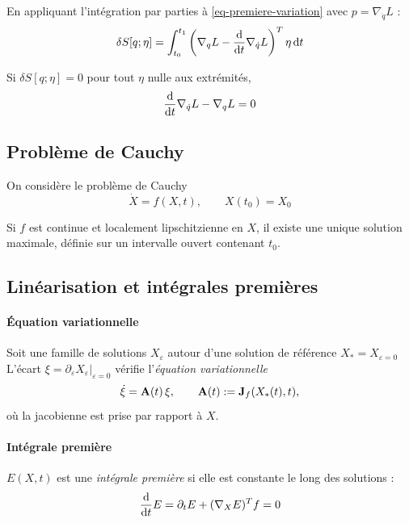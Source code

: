 En appliquant l'intégration par parties à
\eqref{eq-premiere-variation} avec $p = \nabla_{\dot q}L$ :
\[
    \delta S[q;\eta] = \int_{t_0}^{t_1}
    \left(\nabla_q L - \frac{\mathrm{d}}{\mathrm{d} t}\nabla_{\dot q} L\right)^T\eta\,\mathrm{d} t
\]

\begin{corollaire}
    Si $\delta S[q;\eta] = 0$ pour tout $\eta$ nulle aux extrémités,
    \[
        \frac{\mathrm{d}}{\mathrm{d} t}\nabla_{\dot q} L - \nabla_q L = 0
    \]
\end{corollaire}

\subsection{Problème de Cauchy}

On considère le problème de Cauchy
\[
    \dot X = f(X,t),
    \qquad X(t_0) = X_0
\]

\begin{theoreme}
    Si $f$ est continue et localement lipschitzienne en $X$, il existe
    une unique solution maximale, définie sur un intervalle ouvert
    contenant $t_0$.
\end{theoreme}

\subsection{Linéarisation et intégrales premières}

\paragraph{Équation variationnelle}

Soit une famille de solutions $X_\varepsilon$ autour d'une solution
de référence $X_* = X_{\varepsilon=0}$ L'écart
$\xi = \partial_\varepsilon X_\varepsilon|_{\varepsilon=0}$ vérifie
l'\emph{équation variationnelle}
\[
    \dot\xi = \mathbf{A}(t)\,\xi,
    \qquad \mathbf{A}(t) := \mathbf{J}_f(X_*(t),t),
\]
où la jacobienne est prise par rapport à $X$.

\paragraph{Intégrale première}

\begin{definition}
    $E(X,t)$ est une \emph{intégrale première} si elle est constante
    le long des solutions :
    \[
        \frac{\mathrm{d}}{\mathrm{d} t} E = \partial_t E + (\nabla_X E)^T f = 0
    \]
\end{definition}
